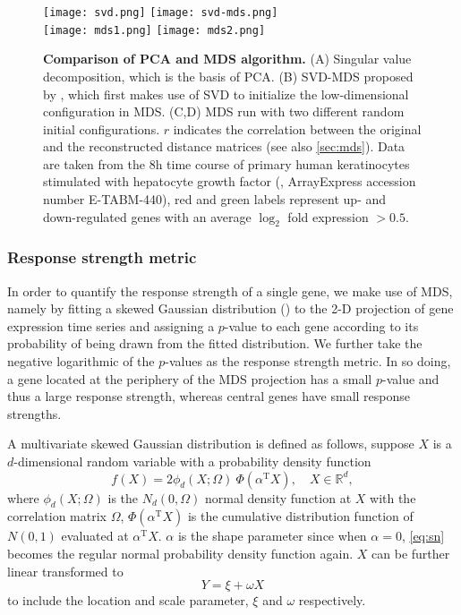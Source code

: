 \begin{figure}[!ht]
\centering
\texttt{[image: svd.png]}
\texttt{[image: svd-mds.png]}\\
\texttt{[image: mds1.png]}
\texttt{[image: mds2.png]}
\caption[Performance of the MDS algorithm]{
{\bf Comparison of PCA and MDS algorithm.}
(A) Singular 
value decomposition, which is the basis of PCA. (B) SVD-MDS
proposed by \citealp{Becavin2011}, which first makes use of
SVD to initialize the low-dimensional configuration in MDS.
(C,D) MDS run with two different random initial 
configurations. $r$ indicates the correlation between the
original and the reconstructed distance matrices (see also
\ref{sec:mds}). 
Data are taken from the 8h time course of primary human keratinocytes 
stimulated with hepatocyte growth factor (\cite{Busch2008}, 
ArrayExpress accession number E-TABM-440),
red and green labels represent up- and 
down-regulated genes with an average $\log_2$ fold expression 
$> 0.5$. }
\label{fig:svd-mds}
\end{figure}

\subsubsection{Response strength metric}
\label{sec:response_strength}
In order to quantify the response strength of a single gene, we make use of 
MDS, namely by fitting a skewed Gaussian distribution (\citealp{Azzalini2003}) 
to the 2-D projection
of gene expression time series and assigning a $p$-value to each
gene according to its probability of being drawn from the fitted distribution.
We further take the negative logarithmic of the $p$-values as the response
strength metric. In so doing, a gene located at the periphery of the MDS
projection has a small $p$-value and thus a large response strength, whereas
central genes have small response strengths.

A multivariate skewed Gaussian distribution is defined as follows, suppose
$X$ is a $d$-dimensional random variable with a probability density function
\begin{equation}
f(X) = 2 \phi_d (X;\Omega) \ \Phi(\alpha^{\mathrm{T}} X), \quad X \in \mathbb{R}^d,
\label{eq:sn}
\end{equation}
where $\phi_d(X;\Omega)$ is the $N_d(0,\Omega)$ normal density function at $X$
with the correlation matrix $\Omega$, $\Phi(\alpha^{\mathrm{T}} X)$ is the 
cumulative distribution function of $N(0,1)$ evaluated at $\alpha^{\mathrm{T}} X$.
$\alpha$ is the shape parameter since when $\alpha=0$, \ref{eq:sn} becomes
the regular normal probability density function again. $X$ can be further
linear transformed to
\[
Y = \xi + \omega X
\]
to include the location and scale parameter, $\xi$ and $\omega$ respectively.

